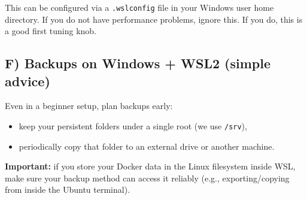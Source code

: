 This can be configured via a \texttt{.wslconfig} file in your Windows user home directory.
If you do not have performance problems, ignore this.
If you do, this is a good first tuning knob.

\subsection{F) Backups on Windows + WSL2 (simple advice)}
Even in a beginner setup, plan backups early:
\begin{itemize}[leftmargin=*]
  \item keep your persistent folders under a single root (we use \texttt{/srv}),
  \item periodically copy that folder to an external drive or another machine.
\end{itemize}

\textbf{Important:} if you store your Docker data in the Linux filesystem inside WSL,
make sure your backup method can access it reliably (e.g., exporting/copying from inside the Ubuntu terminal). 